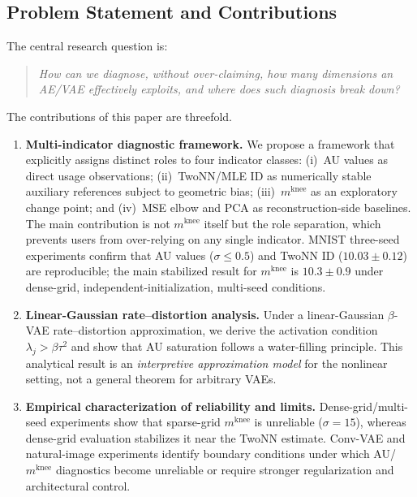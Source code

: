 \documentclass[make,article,submit,pdftex,moreauthors]{Definitions/mdpi}
\newcommand{\mknee}{m^{\mathrm{knee}}}
\begin{document}
\subsection{Problem Statement and Contributions}\label{sec:intro_aim}

The central research question is:
\begin{quote}
\emph{How can we diagnose, without over-claiming, how many dimensions an AE/VAE
effectively exploits, and where does such diagnosis break down?}
\end{quote}

The contributions of this paper are threefold.

\begin{enumerate}
\item \textbf{Multi-indicator diagnostic framework.}
We propose a framework that explicitly assigns distinct roles to four
indicator classes: (i)~AU values as direct usage observations; (ii)~TwoNN/MLE
ID as numerically stable auxiliary references subject to geometric bias;
(iii)~$\mknee$ as an exploratory change point; and (iv)~MSE elbow and PCA as
reconstruction-side baselines.
The main contribution is not $\mknee$ itself but the role separation, which
prevents users from over-relying on any single indicator.
MNIST three-seed experiments confirm that AU values ($\sigma\!\leq\!0.5$) and
TwoNN ID ($10.03\pm0.12$) are reproducible; the main stabilized result for
$\mknee$ is $10.3\pm0.9$ under dense-grid, independent-initialization,
multi-seed conditions.

\item \textbf{Linear-Gaussian rate--distortion analysis.}
Under a linear-Gaussian $\beta$-VAE rate--distortion approximation, we derive
the activation condition $\lambda_j>\beta\tau^2$ and show that AU saturation
follows a water-filling principle.
This analytical result is an \emph{interpretive approximation model} for the
nonlinear setting, not a general theorem for arbitrary VAEs.

\item \textbf{Empirical characterization of reliability and limits.}
Dense-grid/multi-seed experiments show that sparse-grid $\mknee$ is unreliable
($\sigma=15$), whereas dense-grid evaluation stabilizes it near the TwoNN
estimate.
Conv-VAE and natural-image experiments identify boundary conditions under which
AU/$\mknee$ diagnostics become unreliable or require stronger regularization and
architectural control.
\end{enumerate}
\end{document}

